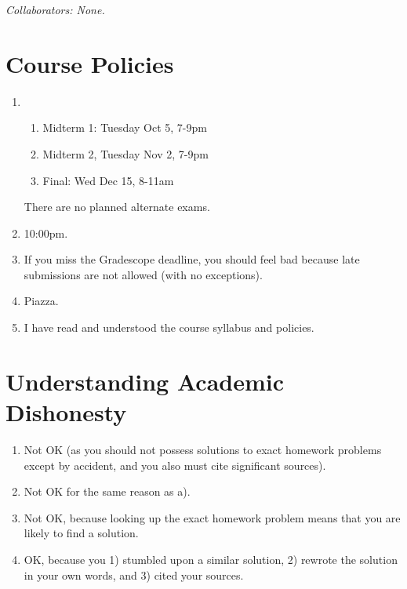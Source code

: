 \documentclass{article}
\title{\DocumentTitle{}}
\author{\Name{} (SID \StudentID{})}
\date{}
\begin{document}
\maketitle

\textit{Collaborators: None.}

\setcounter{section}{1}
\section{Course Policies}

\begin{enumerate}[label = {\alph*)}]
\item
\begin{enumerate}[label = {\arabic*)}]
\item Midterm 1: Tuesday Oct 5, 7-9pm
\item Midterm 2, Tuesday Nov 2, 7-9pm
\item Final: Wed Dec 15, 8-11am
\end{enumerate}

There are no planned alternate exams.

\item 10:00pm.

\item If you miss the Gradescope deadline, you should feel bad because late submissions are not allowed (with no exceptions).

\item Piazza.

\item I have read and understood the course syllabus and policies.
\end{enumerate}

\newpage{}
\section{Understanding Academic Dishonesty}
\begin{enumerate}[label = {\alph*)}]
\item Not OK (as you should not possess solutions to exact homework problems except by accident, and you also must cite significant sources).
\item Not OK for the same reason as a).
\item Not OK, because looking up the exact homework problem means that you are likely to find a solution.
\item OK, because you 1) stumbled upon a similar solution, 2) rewrote the solution in your own words, and 3) cited your sources.
\end{enumerate}
\end{document}

